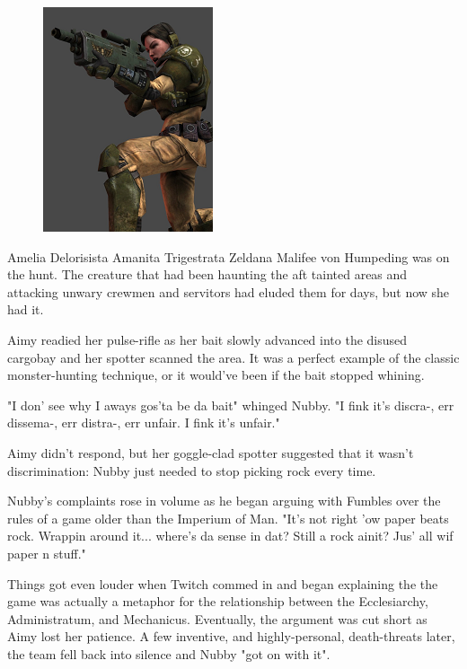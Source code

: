 

\begin{figure}
	\begin{center}
		\includegraphics[width=\figwidth]{pics/13/3.png}
	\end{center}
\end{figure}
Amelia Delorisista Amanita Trigestrata Zeldana Malifee von Humpeding was on the hunt. 
The creature that had been haunting the aft tainted areas and attacking unwary crewmen and servitors had eluded them for days, but now she had it.

Aimy readied her pulse-rifle as her bait slowly advanced into the disused cargobay and her spotter scanned the area. 
It was a perfect example of the classic monster-hunting technique, or it would've been if the bait stopped whining.

"I don' see  why I aways gos'ta be da bait" whinged Nubby. 
"I fink it's discra-, err dissema-, err distra-, err unfair. 
I fink it's unfair."

Aimy didn't respond, but her goggle-clad spotter suggested that it wasn't discrimination: 
Nubby just needed to stop picking rock every time.

Nubby's complaints rose in volume as he began arguing with Fumbles over the rules of a game older than the Imperium of Man. 
"It's not right 'ow paper beats rock. 
Wrappin around it... 
where's da sense in dat? 
Still a rock ainit? 
Jus' all wif paper n stuff."

Things got even louder when Twitch commed in and began explaining the the game was actually a metaphor for the relationship between the Ecclesiarchy, Administratum, and Mechanicus. 
Eventually, the argument was cut short as Aimy lost her patience. 
A few inventive, and highly-personal, death-threats later, the team fell back into silence and Nubby "got on with it".

